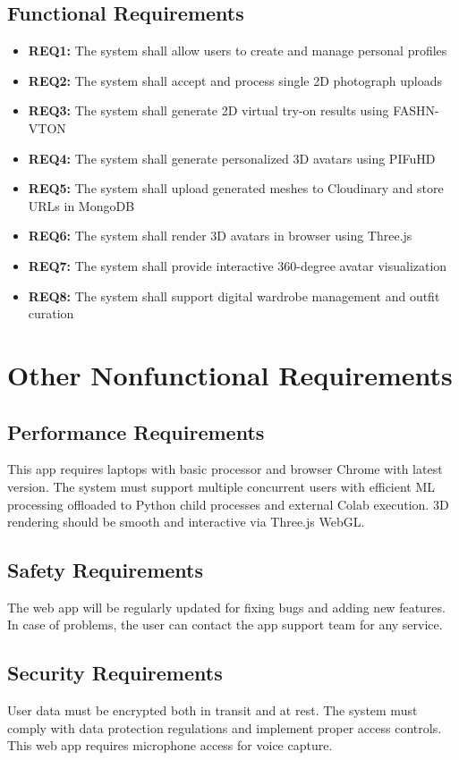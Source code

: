 \documentclass[12pt,a4paper,oneside]{report}
\begin{document}
\subsection{Functional Requirements}
\begin{itemize}
    \item \textbf{REQ1:} The system shall allow users to create and manage personal profiles
    \item \textbf{REQ2:} The system shall accept and process single 2D photograph uploads
    \item \textbf{REQ3:} The system shall generate 2D virtual try-on results using FASHN-VTON
    \item \textbf{REQ4:} The system shall generate personalized 3D avatars using PIFuHD
    \item \textbf{REQ5:} The system shall upload generated meshes to Cloudinary and store URLs in MongoDB
    \item \textbf{REQ6:} The system shall render 3D avatars in browser using Three.js
    \item \textbf{REQ7:} The system shall provide interactive 360-degree avatar visualization
    \item \textbf{REQ8:} The system shall support digital wardrobe management and outfit curation
\end{itemize}

\section{Other Nonfunctional Requirements}

\subsection{Performance Requirements}
This app requires laptops with basic processor and browser Chrome with latest version. The system must support multiple concurrent users with efficient ML processing offloaded to Python child processes and external Colab execution. 3D rendering should be smooth and interactive via Three.js WebGL.

\subsection{Safety Requirements}
The web app will be regularly updated for fixing bugs and adding new features. In case of problems, the user can contact the app support team for any service.

\subsection{Security Requirements}
User data must be encrypted both in transit and at rest. The system must comply with data protection regulations and implement proper access controls. This web app requires microphone access for voice capture.
\end{document}
